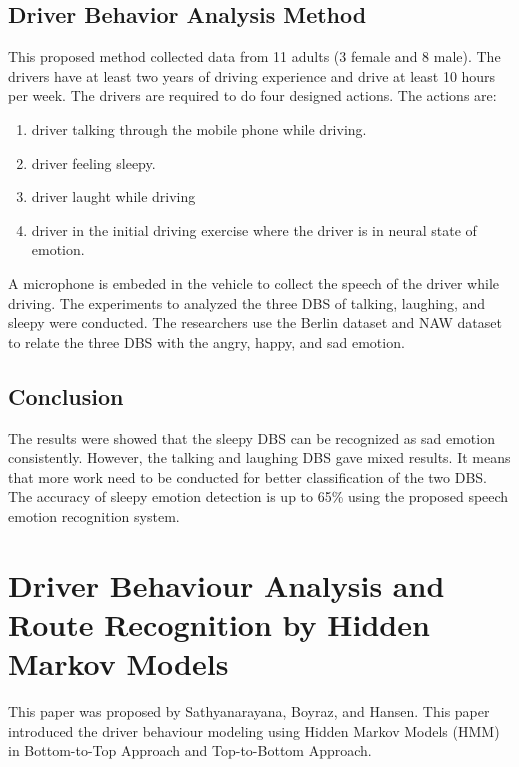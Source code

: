 \subsection{Driver Behavior Analysis Method}
This proposed method collected data from 11 adults (3 female and 8 male). The drivers have at least two years of driving experience and drive at least 10 hours per week. The drivers are required to do four designed actions. The actions are: 
\begin{enumerate}
\item driver talking through the mobile phone while driving.
\item driver feeling sleepy.
\item driver laught while driving
\item driver in the initial driving exercise where the driver is in neural state of emotion.
\end{enumerate}

A microphone is embeded in the vehicle to collect the speech of the driver while driving. The experiments to analyzed the three DBS of talking, laughing, and sleepy were conducted. The researchers use the Berlin dataset and NAW dataset to relate the three DBS with the angry, happy, and sad emotion.

\subsection{Conclusion}
The results were showed that the sleepy DBS can be recognized as sad emotion consistently. However, the talking and laughing DBS gave mixed results. It means that more work need to be conducted for better classification of the two DBS. The accuracy of sleepy emotion detection is up to 65\% using the proposed speech emotion recognition system.


\section{Driver Behaviour Analysis and Route Recognition by Hidden Markov Models}
This paper was proposed by Sathyanarayana, Boyraz, and Hansen\citeyear{sath:2008}. This paper introduced the driver behaviour modeling using Hidden Markov Models (HMM) in Bottom-to-Top Approach and Top-to-Bottom Approach.

